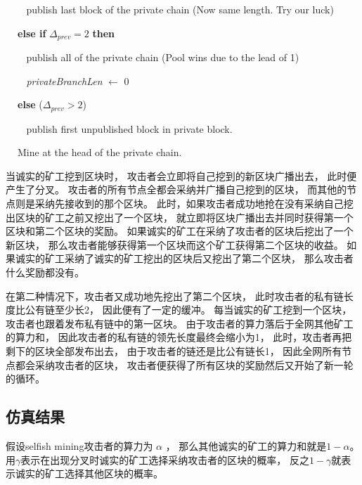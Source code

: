\documentclass[a4paper, 11pt]{article}
\begin{document}
\begin{CJK*}{UTF8}{gbsn}
\begin{algorithm}
                $\ \ \ \ \ \ \ \ $ publish last block of the private chain \hfill (Now same length. Try our luck)

            $\ \ \ \ $ \textbf{else if} $\Delta_{\textit{prev}} = 2 $ \textbf{then}

                $\ \ \ \ \ \ \ \ $ publish all of the private chain \hfill (Pool wins due to the lead of 1)

                $\ \ \ \ \ \ \ \ $ \textit{privateBranchLen} $\leftarrow$ 0
            
            $\ \ \ \ $ \textbf{else} \hfill ($\Delta_{\textit{prev}} > 2$)

                $\ \ \ \ \ \ \ \ $ publish first unpublished block in private block.
            
            $\ \ \ \ $ Mine at the head of the private chain.

    \end{algorithm}

    当诚实的矿工挖到区块时，
    攻击者会立即将自己挖到的新区块广播出去，
    此时便产生了分叉。
    攻击者的所有节点全都会采纳并广播自己挖到的区块，
    而其他的节点则是采纳先接收到的那个区块。
    此时，如果攻击者成功地抢在没有采纳自己挖出区块的矿工之前又挖出了一个区块，
    就立即将区块广播出去并同时获得第一个区块和第二个区块的奖励。
    如果诚实的矿工在采纳了攻击者的区块后挖出了一个新区块，
    那么攻击者能够获得第一个区块而这个矿工获得第二个区块的收益。
    如果诚实的矿工采纳了诚实的矿工挖出的区块后又挖出了第二个区块，
    那么攻击者什么奖励都没有。

    在第二种情况下，攻击者又成功地先挖出了第二个区块，
    此时攻击者的私有链长度比公有链至少长2，
    因此便有了一定的缓冲。
    每当诚实的矿工挖到一个区块，
    攻击者也跟着发布私有链中的第一区块。
    由于攻击者的算力落后于全网其他矿工的算力和，
    因此攻击者的私有链的领先长度最终会缩小为1，
    此时，攻击者再把剩下的区块全部发布出去，
    由于攻击者的链还是比公有链长1，
    因此全网所有节点都会采纳攻击者的区块，
    攻击者便获得了所有区块的奖励然后又开始了新一轮的循环。

    \subsection{仿真结果}

    \indent

    假设selfish mining攻击者的算力为 $ \alpha$ ，
    那么其他诚实的矿工的算力和就是$1 - \alpha$。
    用$\gamma$表示在出现分叉时诚实的矿工选择采纳攻击者的区块的概率，
    反之$1 - \gamma$就表示诚实的矿工选择其他区块的概率。


\end{CJK*}
\end{document}
